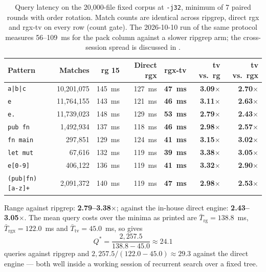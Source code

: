 \documentclass[11pt,letterpaper]{article}
\begin{document}
\begin{table}[htbp]
\centering
\footnotesize
\caption{Query latency on the 20{,}000-file fixed corpus at \texttt{-j32},
minimum of 7 paired rounds with order rotation. Match counts are identical
across ripgrep, direct rgx and rgx-tv on every row (count gate). The
2026-10-10 run of the same protocol measures 56--109~ms for the pack
column against a slower ripgrep arm; the cross-session spread is discussed
in .}
\label{tab:small}
\begin{tabular}{@{}lrrrrrr@{}}
\toprule
\textbf{Pattern} & \textbf{Matches} & \textbf{rg 15} & \textbf{Direct rgx}
  & \textbf{rgx-tv} & \textbf{tv vs.\ rg} & \textbf{tv vs.\ rgx} \\
\midrule
\texttt{a|b|c}      & 10{,}201{,}075 & 145~ms & 127~ms & \textbf{47~ms} & \textbf{3.09$\times$} & \textbf{2.70$\times$} \\
\texttt{e}          & 11{,}764{,}155 & 143~ms & 121~ms & \textbf{46~ms} & \textbf{3.11$\times$} & \textbf{2.63$\times$} \\
\texttt{e.}         & 11{,}739{,}023 & 148~ms & 129~ms & \textbf{53~ms} & \textbf{2.79$\times$} & \textbf{2.43$\times$} \\
\texttt{pub fn}     &  1{,}492{,}934 & 137~ms & 118~ms & \textbf{46~ms} & \textbf{2.98$\times$} & \textbf{2.57$\times$} \\
\texttt{fn main}    &    297{,}851 & 129~ms & 124~ms & \textbf{41~ms} & \textbf{3.15$\times$} & \textbf{3.02$\times$} \\
\texttt{let mut}    &     67{,}616 & 132~ms & 119~ms & \textbf{39~ms} & \textbf{3.38$\times$} & \textbf{3.05$\times$} \\
\texttt{e[0-9]}     &    406{,}122 & 136~ms & 119~ms & \textbf{41~ms} & \textbf{3.32$\times$} & \textbf{2.90$\times$} \\
\texttt{(pub|fn) [a-z]+} &  2{,}091{,}372 & 140~ms & 119~ms & \textbf{47~ms} & \textbf{2.98$\times$} & \textbf{2.53$\times$} \\
\bottomrule
\end{tabular}
\end{table}

Range against ripgrep: \textbf{2.79--3.38$\times$}; against the in-house
direct engine: \textbf{2.43--3.05$\times$}. The mean query costs over the
minima as printed are
$\bar{T}_{\text{rg}} = 138.8$~ms, $\bar{T}_{\text{rgx}} = 122.0$~ms and
$\bar{T}_{\text{tv}} = 45.0$~ms, so  gives
\begin{equation}
Q^{*} = \frac{2{,}257.5}{138.8-45.0} \approx 24.1
\end{equation}
queries against ripgrep and $2{,}257.5/(122.0-45.0)\approx 29.3$ against
the direct engine --- both well inside a working session of recurrent
search over a fixed tree.
\end{document}
